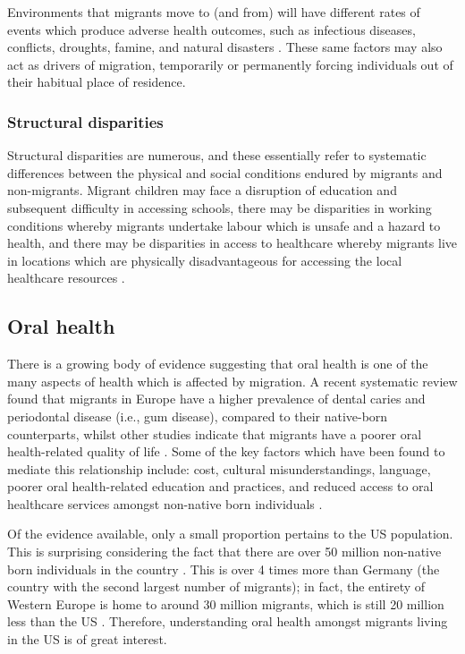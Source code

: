 Environments that migrants move to (and from) will have different rates of events which produce adverse health outcomes, such as infectious diseases, conflicts, droughts, famine, and natural disasters \citep{abubakr2018}. These same factors may also act as drivers of migration, temporarily or permanently forcing individuals out of their habitual place of residence.

\subsubsection{Structural disparities}

Structural disparities are numerous, and these essentially refer to systematic differences between the physical and social conditions endured by migrants and non-migrants. Migrant children may face a disruption of education and subsequent difficulty in accessing schools, there may be disparities in working conditions whereby migrants undertake labour which is unsafe and a hazard to health, and there may be disparities in access to healthcare whereby migrants live in locations which are physically disadvantageous for accessing the local healthcare resources \citep{abubakr2018}.

\subsection{Oral health}

There is a growing body of evidence suggesting that oral health is one of the many aspects of health which is affected by migration. A recent systematic review found that migrants in Europe have a higher prevalence of dental caries and periodontal disease (i.e., gum disease), compared to their native-born counterparts, whilst other studies indicate that migrants have a poorer oral health-related quality of life \citep{lauritano2021, aarabi2022}. Some of the key factors which have been found to mediate this relationship include: cost, cultural misunderstandings, language, poorer oral health-related education and practices, and reduced access to oral healthcare services amongst non-native born individuals \citep{pabbla2021, riggs2014, newton2001}. 

Of the evidence available, only a small proportion pertains to the US population. This is surprising considering the fact that there are over 50 million non-native born individuals in the country \citep{un2019}. This is over 4 times more than Germany (the country with the second largest number of migrants); in fact, the entirety of Western Europe is home to around 30 million migrants, which is still 20 million less than the US \citep{un2019}. Therefore, understanding oral health amongst migrants living in the US is of great interest.

